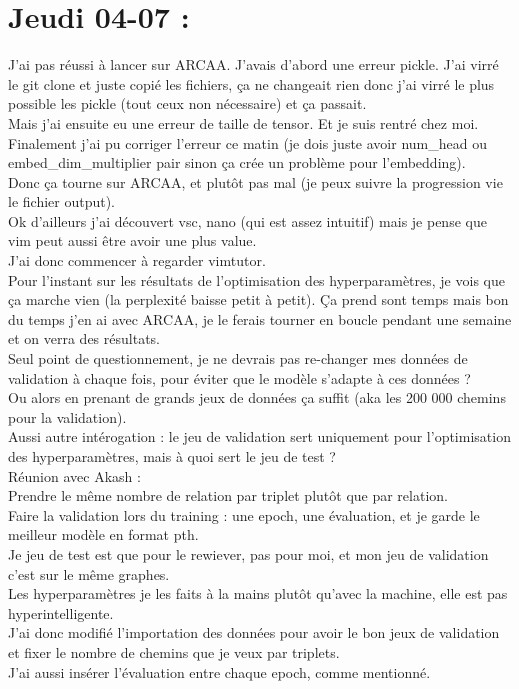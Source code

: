 \documentclass{article}
\begin{document}
\section*{Jeudi 04-07 :}
J'ai pas réussi à lancer sur ARCAA. J'avais d'abord une erreur pickle. J'ai virré le git clone et juste copié les fichiers, ça ne changeait rien donc j'ai virré le plus possible les pickle (tout ceux non nécessaire) et ça passait.\\
Mais j'ai ensuite eu une erreur de taille de tensor. Et je suis rentré chez moi.\\
Finalement j'ai pu corriger l'erreur ce matin (je dois juste avoir num\_head ou embed\_dim\_multiplier pair sinon ça crée un problème pour l'embedding).\\
Donc ça tourne sur ARCAA, et plutôt pas mal (je peux suivre la progression vie le fichier output).\\
Ok d'ailleurs j'ai découvert vsc, nano (qui est assez intuitif) mais je pense que vim peut aussi être avoir une plus value.\\
J'ai donc commencer à regarder vimtutor.\\
Pour l'instant sur les résultats de l'optimisation des hyperparamètres, je vois que ça marche vien (la perplexité baisse petit à petit). Ça prend sont temps mais bon du temps j'en ai avec ARCAA, je le ferais tourner en boucle pendant une semaine et on verra des résultats.\\
Seul point de questionnement, je ne devrais pas re-changer mes données de validation à chaque fois, pour éviter que le modèle s'adapte à ces données ?\\
Ou alors en prenant de grands jeux de données ça suffit (aka les 200 000 chemins pour la validation).\\
Aussi autre intérogation : le jeu de validation sert uniquement pour l'optimisation des hyperparamètres, mais à quoi sert le jeu de test ?\\
Réunion avec Akash :\\
Prendre le même nombre de relation par triplet plutôt que par relation.\\
Faire la validation lors du training : une epoch, une évaluation, et je garde le meilleur modèle en format pth.\\
Je jeu de test est que pour le rewiever, pas pour moi, et mon jeu de validation c'est sur le même graphes.\\
Les hyperparamètres je les faits à la mains plutôt qu'avec la machine, elle est pas hyperintelligente.\\
J'ai donc modifié l'importation des données pour avoir le bon jeux de validation et fixer le nombre de chemins que je veux par triplets.\\
J'ai aussi insérer l'évaluation entre chaque epoch, comme mentionné.\\
\end{document}
